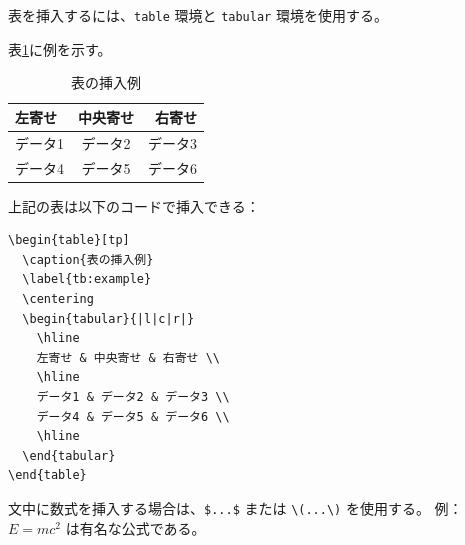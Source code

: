 表を挿入するには、\verb|table| 環境と \verb|tabular| 環境を使用する。


表\ref{tb:example}に例を示す。

\begin{table}[tp]
  \caption{表の挿入例}
  \label{tb:example}
  \centering
  \begin{tabular}{|l|c|r|}
    \hline
    左寄せ & 中央寄せ & 右寄せ \\
    \hline
    データ1 & データ2 & データ3 \\
    データ4 & データ5 & データ6 \\
    \hline
  \end{tabular}
\end{table}

上記の表は以下のコードで挿入できる：

\begin{verbatim}
\begin{table}[tp]
  \caption{表の挿入例}
  \label{tb:example}
  \centering
  \begin{tabular}{|l|c|r|}
    \hline
    左寄せ & 中央寄せ & 右寄せ \\
    \hline
    データ1 & データ2 & データ3 \\
    データ4 & データ5 & データ6 \\
    \hline
  \end{tabular}
\end{table}
\end{verbatim}



文中に数式を挿入する場合は、\verb|$...$| または \verb|\(...\)| を使用する。
例：$E = mc^2$ は有名な公式である。


